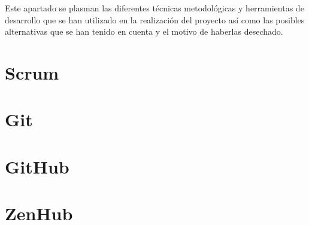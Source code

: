 
\begin{comment}
Esta parte de la memoria tiene como objetivo presentar las técnicas metodológicas y las herramientas de desarrollo que se han utilizado para llevar a cabo el proyecto. Si se han estudiado diferentes alternativas de metodologías, herramientas, bibliotecas se puede hacer un resumen de los aspectos más destacados de cada alternativa, incluyendo comparativas entre las distintas opciones y una justificación de las elecciones realizadas. 
No se pretende que este apartado se convierta en un capítulo de un libro dedicado a cada una de las alternativas, sino comentar los aspectos más destacados de cada opción, con un repaso somero a los fundamentos esenciales y referencias bibliográficas para que el lector pueda ampliar su conocimiento sobre el tema.
\end{comment}

\begin{comment}
scrum
git
github,gitlab,bitbucket
zenhub
IDE:vs code, pycharm, editor latex
latex,editor latex
zotero

lenguaje python,librerias
\end{comment}

Este apartado se plasman las diferentes técnicas metodológicas y herramientas de desarrollo que se han utilizado en la realización del proyecto así como las posibles alternativas que se han tenido en cuenta y el motivo de haberlas desechado.

\section{Scrum}\label{Scrum}

\section{Git}\label{Git}

\section{GitHub}\label{GitHub}

\section{ZenHub}\label{ZenHub}

